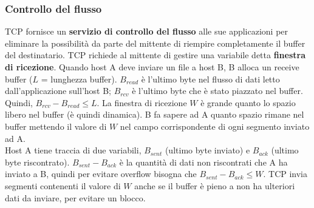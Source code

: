 \documentclass[11pt]{article}
\begin{document}
\subsubsection{Controllo del flusso}
TCP fornisce un \textbf{servizio di controllo del flusso} alle sue applicazioni per eliminare la possibilità da parte del 
mittente di riempire completamente il buffer del destinatario.
TCP richiede al mittente di gestire una variabile detta \textbf{finestra di ricezione}. 
Quando host A deve inviare un file a host B, B alloca un receive buffer ($L$ = lunghezza buffer). $B_{read}$ è l'ultimo byte 
nel flusso di dati letto dall'applicazione sull'host B; $B_{rcv}$ è l'ultimo byte che è stato piazzato nel buffer. Quindi, 
$B_{rcv}-B_{read}\leq L$. La finestra di ricezione $W$ è grande quanto lo spazio libero nel buffer (è quindi dinamica). 
B fa sapere ad A quanto spazio rimane nel buffer mettendo il valore di $W$ nel campo corrispondente di ogni segmento 
inviato ad A.\\
Host A tiene traccia di due variabili, $B_{sent}$ (ultimo byte inviato) e $B_{ack}$ (ultimo byte riscontrato).
$B_{sent}-B_{ack}$ è la quantità di dati non riscontrati che A ha inviato a B, quindi per evitare overflow bisogna che 
$B_{sent}-B_{ack}\leq W$. TCP invia segmenti contenenti il valore di $W$ anche se il buffer è pieno a non ha ulteriori 
dati da inviare, per evitare un blocco.
\end{document}
